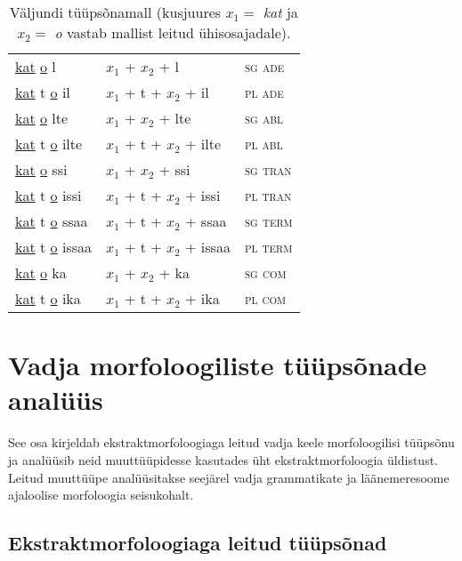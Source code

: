 \documentclass[12pt,a4paper]{article}
\begin{document}
\begin{table}[H]
\begin{minipage}[t]{.55\textwidth}
\begin{tabular}[t]{l l l}
      \underline{kat}   \underline{o} l     & $x_1$ + $x_2$ + l         & \textsc{sg ade} \\
      \underline{kat} t \underline{o} il    & $x_1$ + t + $x_2$ + il    & \textsc{pl ade} \\
      \underline{kat}   \underline{o} lte   & $x_1$ + $x_2$ + lte       & \textsc{sg abl} \\
      \underline{kat} t \underline{o} ilte  & $x_1$ + t + $x_2$ + ilte  & \textsc{pl abl} \\
      \underline{kat}   \underline{o} ssi   & $x_1$ + $x_2$ + ssi       & \textsc{sg tran} \\
      \underline{kat} t \underline{o} issi  & $x_1$ + t + $x_2$ + issi  & \textsc{pl tran} \\
      \underline{kat} t \underline{o} ssaa  & $x_1$ + t + $x_2$ + ssaa  & \textsc{sg term} \\
      \underline{kat} t \underline{o} issaa & $x_1$ + t + $x_2$ + issaa & \textsc{pl term} \\
      \underline{kat}   \underline{o} ka    & $x_1$ + $x_2$ + ka        & \textsc{sg com} \\
      \underline{kat} t \underline{o} ika   & $x_1$ + t + $x_2$ + ika   & \textsc{pl com} \\
    \end{tabular}
    \caption{Väljundi tüüpsõnamall (kus\-juures $x_1 = $ \textit{kat} ja $x_2 = $ \textit{o} vastab mallist leitud ühisosajadale).}
    \label{tab:väljundtabel_katto}
  \end{minipage}
\end{table}








\newpage
\section{Vadja morfoloogiliste tüüpsõnade analüüs}
\label{sec:analüüs}

See osa kirjeldab ekstraktmorfoloogiaga leitud vadja keele morfoloogilisi tüüpsõnu ja analüüsib neid muuttüüpidesse kasutades üht ekstraktmorfoloogia üldistust. Leitud muuttüüpe analüüsitakse seejärel vadja grammatikate ja läänemeresoome ajaloolise morfoloogia seisukohalt.




\subsection{Ekstraktmorfoloogiaga leitud tüüpsõnad}
\end{document}
